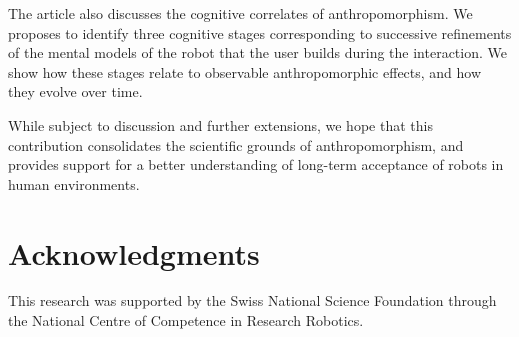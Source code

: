 \documentclass{frontiersSCNS} %
\begin{document}
The article also discusses the cognitive correlates of anthropomorphism. We
proposes to identify three cognitive stages corresponding to successive
refinements of the mental models of the robot that the user builds during the
interaction. We show how these stages relate to observable anthropomorphic
effects, and how they evolve over time.

While subject to discussion and further extensions, we hope that this
contribution consolidates the scientific grounds of anthropomorphism, and
provides support for a better understanding of long-term acceptance of robots in
human environments.


\section*{Acknowledgments}

This research was supported by the Swiss National Science Foundation through the National Centre of Competence in Research Robotics.


\end{document}
